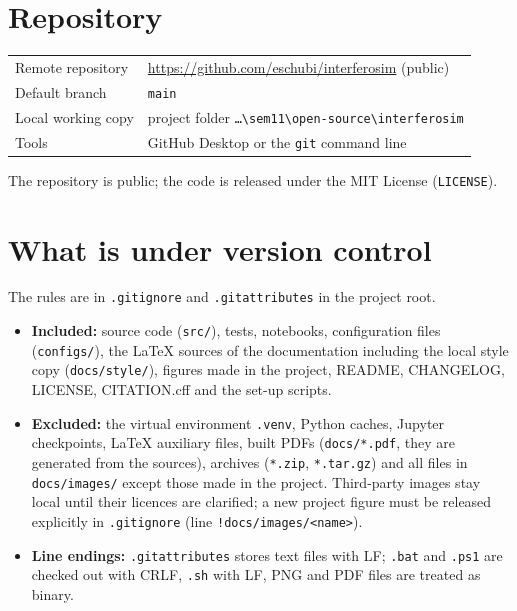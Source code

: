 
\section{Repository}

\begin{center}
\begin{tabular}{@{}ll@{}}
\toprule
Remote repository & \url{https://github.com/eschubi/interferosim} (public) \\
Default branch & \texttt{main} \\
Local working copy & project folder \texttt{\ldots\textbackslash sem11\textbackslash open-source\textbackslash interferosim} \\
Tools & GitHub Desktop or the \texttt{git} command line \\
\bottomrule
\end{tabular}
\end{center}

The repository is public; the code is released under the MIT License
(\texttt{LICENSE}).

\section{What is under version control}

The rules are in \texttt{.gitignore} and \texttt{.gitattributes} in the
project root.
\begin{itemize}
  \item \textbf{Included:} source code (\texttt{src/}), tests,
        notebooks, configuration files (\texttt{configs/}), the \LaTeX{}
        sources of the documentation including the local style copy
        (\texttt{docs/style/}), figures made in the project, README,
        CHANGELOG, LICENSE, CITATION.cff and the set-up scripts.
  \item \textbf{Excluded:} the virtual environment \texttt{.venv},
        Python caches, Jupyter checkpoints, \LaTeX{} auxiliary files,
        built PDFs (\texttt{docs/*.pdf}, they are generated from the
        sources), archives (\texttt{*.zip}, \texttt{*.tar.gz}) and all
        files in \texttt{docs/images/} except those made in the project.
        Third-party images stay local until their licences are clarified;
        a new project figure must be released explicitly in
        \texttt{.gitignore} (line \texttt{!docs/images/<name>}).
  \item \textbf{Line endings:} \texttt{.gitattributes} stores text files
        with LF; \texttt{.bat} and \texttt{.ps1} are checked out with CRLF,
        \texttt{.sh} with LF, PNG and PDF files are treated as binary.
\end{itemize}

